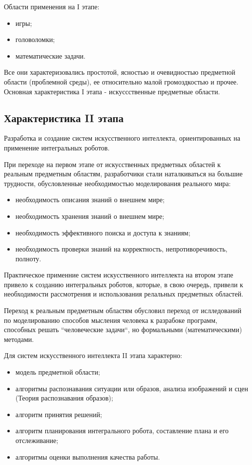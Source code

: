 \documentclass[a4paper,12pt]{report}
\begin{document}
	Области применения на I этапе:
	\begin{itemize}
		\item игры;
		\item головоломки;
		\item математические задачи.\\
	\end{itemize}

	Все они характеризовались простотой, ясностью и очевидностью предметной
	области (проблемной среды), ее относительно малой громоздкостью и прочее. \\

	Основная характеристика I этапа - искуссственные предметные области.


\subsection{Характеристика II этапа}
	Разработка и создание систем искусственного интеллекта,
	ориентированных на применение интегральных роботов. \par
	При переходе на первом этапе от искусственных предметных областей к реальным
	предметным областям, разработчики стали наталкиваться на большие трудности,
	обусловленные необходимостью моделирования реального мира:
	\begin{itemize}
		\item необходимость описания знаний о внешнем мире;
		\item необходимость хранения знаний о внешнем мире;
		\item необходимость эффективного поиска и доступа к знаниям;
		\item необходимость проверки знаний на корректность,
			непротиворечивость, полноту.\\
	\end{itemize}

	Практическое применние систем искусственного интеллекта на втором этапе
	привело к созданию интегральных роботов, которые, в свою очередь, привели к
	необходимости рассмотрения и использования релальных предметных областей.\par
	Переход к реальным предметным областям обусловил переход от ислледований по
	моделированию способов мысления человека к разрабоке программ, способных
	решать ``человеческие задачи``, но формальными (математическими)
	методами.\par
	Для систем искусственного интеллекта II этапа характерно:
	\begin{itemize}
		\item модель предметной области;
		\item алгоритмы распознавания ситуации или образов, анализа изображений и
			сцен (Теория распознавания образов);
		\item алгоритм принятия решений;
		\item алгоритм планирования интегрального робота, составление плана и его
			отслеживание;
		\item алгоритмы оценки выполнения качества работы.\\
	\end{itemize}
\end{document}
